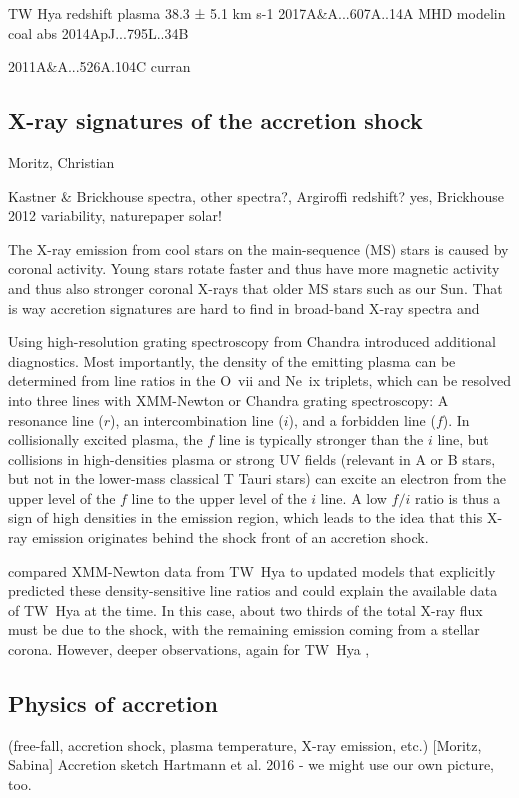 \documentclass[graybox, nosecnum]{svmult}
\begin{document}
TW Hya redshift plasma  38.3 ± 5.1 km s-1  2017A&A...607A..14A 
MHD modelin coal abs 2014ApJ...795L..34B 

2011A&A...526A.104C curran




\subsection{X-ray signatures of the accretion shock}
\label{sect:accretionobs}
{\color{blue}Moritz, Christian

Kastner & Brickhouse spectra, other spectra?, Argiroffi redshift? yes, Brickhouse 2012 variability,  naturepaper solar!}

The X-ray emission from cool stars on the main-sequence (MS) stars is caused by coronal activity. Young stars rotate faster and thus have more magnetic activity and thus also stronger coronal X-rays that older MS stars such as our Sun. That is way accretion signatures are hard to find in broad-band X-ray spectra and 

Using high-resolution grating spectroscopy from Chandra \citet{Kastner_2002} introduced additional diagnostics. Most importantly, the density of the emitting plasma can be determined from line ratios in the O~{\sc vii} and Ne~{\sc ix} triplets, which can be resolved into three lines with XMM-Newton or Chandra grating spectroscopy: A resonance line ($r$), an intercombination line ($i$), and a forbidden line ($f$). In collisionally excited plasma, the $f$ line is typically stronger than the $i$ line, but collisions in high-densities plasma or strong UV fields (relevant in A or B stars, but not in the lower-mass classical T Tauri stars) can excite an electron from the upper level of the $f$ line to the upper level of the $i$ line. A low $f/i$ ratio is thus a sign of high densities in the emission region, which leads to the idea that this X-ray emission originates behind the shock front of an accretion shock.

\citet{Guenther_2007} compared XMM-Newton data from TW~Hya to updated models that explicitly predicted these density-sensitive line ratios and could explain the available data of TW~Hya at the time. In this case, about two thirds of the total X-ray flux must be due to the shock, with the remaining emission coming from a stellar corona. However, deeper observations, again for TW~Hya \citep{Brickhouse_2010}, 


\subsection{Physics of accretion}
\label{sect:accretionphysics}
{\color{blue}(free-fall, accretion shock, plasma temperature, X-ray emission, etc.) [Moritz, Sabina]
Accretion sketch Hartmann et al. 2016 - we might use our own picture, too.

}
\end{document}

